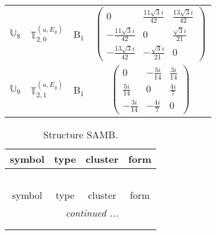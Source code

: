 \documentclass[fleqn,10pt,landscape]{article}
\begin{document}
\begin{itemize}
\begin{center}
\begin{longtable}{c|c|c|c}
$ \mathbb{U}_{8} $ & $\mathbb{T}_{2,0}^{(u,E_{g})}$ & B$_{1}$ & $\begin{pmatrix} 0 & \frac{11 \sqrt{3} i}{42} & \frac{13 \sqrt{3} i}{42} \\ - \frac{11 \sqrt{3} i}{42} & 0 & \frac{\sqrt{3} i}{21} \\ - \frac{13 \sqrt{3} i}{42} & - \frac{\sqrt{3} i}{21} & 0 \end{pmatrix}$ \\
$ \mathbb{U}_{9} $ & $\mathbb{T}_{2,1}^{(u,E_{g})}$ & B$_{1}$ & $\begin{pmatrix} 0 & - \frac{5 i}{14} & \frac{3 i}{14} \\ \frac{5 i}{14} & 0 & \frac{4 i}{7} \\ - \frac{3 i}{14} & - \frac{4 i}{7} & 0 \end{pmatrix}$ \\
\end{longtable}
\end{center}
\begin{center}
\renewcommand{\arraystretch}{1.3}
\begin{longtable}{c|c|c|c}
\caption{Structure SAMB.}
 \\
 \hline \hline
symbol & type & cluster & form \\ \hline \endfirsthead

\multicolumn{3}{l}{\tablename\ \thetable{}} \\
 \hline \hline
symbol & type & cluster & form \\ \hline \endhead

 \hline \hline
\multicolumn{3}{r}{\footnotesize\it continued ...} \\ \endfoot

 \hline \hline
\multicolumn{3}{r}{} \\ \endlastfoot


\end{longtable}
\end{center}
\end{itemize}
\end{document}
